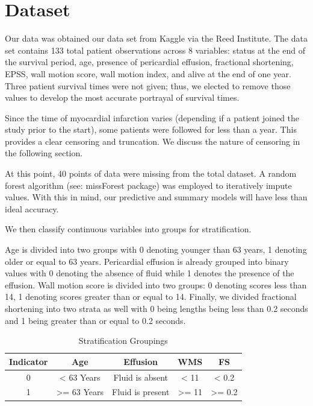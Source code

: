 \documentclass[
]{article}
\begin{document}
\hypertarget{dataset}{%
\section{Dataset}\label{dataset}}

Our data was obtained our data set from Kaggle via the Reed Institute.
The data set contains 133 total patient observations across 8 variables:
status at the end of the survival period, age, presence of pericardial
effusion, fractional shortening, EPSS, wall motion score, wall motion
index, and alive at the end of one year. Three patient survival times
were not given; thus, we elected to remove those values to develop the
most accurate portrayal of survival times.

Since the time of myocardial infarction varies (depending if a patient
joined the study prior to the start), some patients were followed for
less than a year. This provides a clear censoring and truncation. We
discuss the nature of censoring in the following section.

At this point, 40 points of data were missing from the total dataset. A
random forest algorithm (see: missForest package) was employed to
iteratively impute values. With this in mind, our predictive and summary
models will have less than ideal accuracy.

We then classify continuous variables into groups for stratification.

Age is divided into two groups with 0 denoting younger than 63 years, 1
denoting older or equal to 63 years. Pericardial effusion is already
grouped into binary values with 0 denoting the absence of fluid while 1
denotes the presence of the effusion. Wall motion score is divided into
two groups: 0 denoting scores less than 14, 1 denoting scores greater
than or equal to 14. Finally, we divided fractional shortening into two
strata as well with 0 being lengths being less than 0.2 seconds and 1
being greater than or equal to 0.2 seconds.

\begin{table}[!h]

\caption{\label{tab:groupings.table}Stratification Groupings}
\centering
\begin{tabular}[t]{c|c|c|c|c}
\hline
Indicator & Age & Effusion & WMS & FS\\
\hline
0 & < 63 Years & Fluid is absent & < 11 & < 0.2\\
\hline
1 & >= 63 Years & Fluid is present & >= 11 & >= 0.2\\
\hline
\end{tabular}
\end{table}
\end{document}
